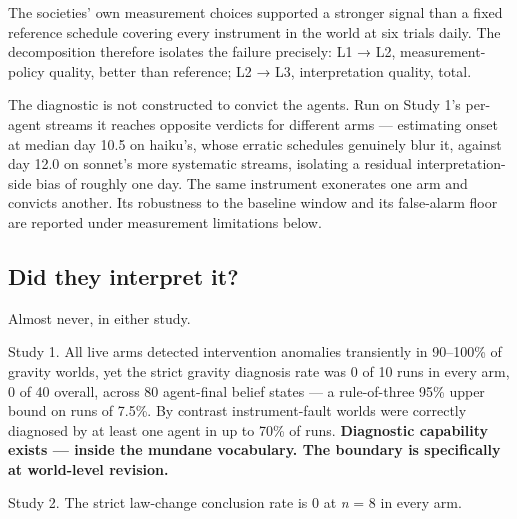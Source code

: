 \documentclass[pdflatex,sn-basic]{sn-jnl}
\begin{document}
The societies' own measurement choices supported a stronger signal than a fixed reference
schedule covering every instrument in the world at six trials daily. The decomposition
therefore isolates the failure precisely: L1 → L2, measurement-policy quality, better than
reference; L2 → L3, interpretation quality, total.

The diagnostic is not constructed to convict the agents. Run on Study 1's per-agent
streams it reaches opposite verdicts for different arms --- estimating onset at median day
10.5 on haiku's, whose erratic schedules genuinely blur it, against day 12.0 on sonnet's
more systematic streams, isolating a residual interpretation-side bias of roughly one day.
The same instrument exonerates one arm and convicts another. Its robustness to the
baseline window and its false-alarm floor are reported under measurement limitations
below.

\hypertarget{did-they-interpret-it}{%
\subsection{Did they interpret it?}\label{did-they-interpret-it}}

Almost never, in either study.

Study 1. All live arms detected intervention anomalies transiently in 90--100\% of
gravity worlds, yet the strict gravity diagnosis rate was 0 of 10 runs in every arm, 0 of
40 overall, across 80 agent-final belief states --- a rule-of-three 95\% upper bound on runs
of 7.5\%. By contrast instrument-fault worlds were correctly diagnosed by at least one
agent in up to 70\% of runs. \textbf{Diagnostic capability exists --- inside the mundane
vocabulary. The boundary is specifically at world-level revision.}

Study 2. The strict law-change conclusion rate is 0 at \emph{n} = 8 in every arm.
\end{document}
